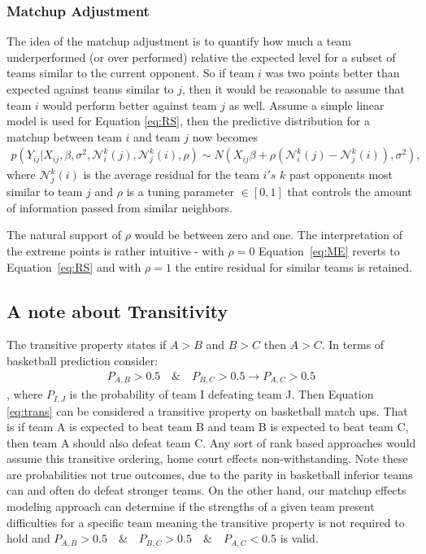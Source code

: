 \subsubsection{Matchup Adjustment}
The idea of the matchup adjustment is to quantify how much a team underperformed (or over performed) relative the expected level for a subset of teams similar to the current opponent.  So if team $i$ was two points better than expected against teams similar to $j$, then it would be reasonable to assume that team $i$ would perform better against team $j$ as well.  Assume a simple linear model is used for Equation \ref{eq:RS}, then the predictive distribution for a matchup between team $i$ and team $j$ now becomes 
\begin{eqnarray}
p(Y_{ij}|X_{ij}, \beta,\sigma^2,\mathcal{N}_i^k(j),\mathcal{N}_j^k(i), \rho) \sim N(X_{ij} \beta + \rho(\mathcal{N}_i^k(j) -\mathcal{N}_j^k(i)), \sigma^2),
\label{eq:ME}
\end{eqnarray}
where $\mathcal{N}_j^k(i)$ is the average residual for the team $i's$ $k$ past opponents most similar to team $j$ and $\rho$ is a tuning parameter $\in [0,1]$ that controls the amount of information passed from similar neighbors. 

The natural support of $\rho$ would be between zero and one.  The interpretation of the extreme points is rather intuitive - with $\rho = 0$ Equation~\ref{eq:ME} reverts to Equation~\ref{eq:RS} and with $\rho = 1$ the entire residual for similar teams is retained. 
\subsection{A note about Transitivity}
The transitive property states if $A>B$ and $B>C$ then $A>C$.   In terms of basketball prediction consider:
\begin{eqnarray}
P_{A,B} > 0.5 \quad \& \quad P_{B,C} > 0.5 \rightarrow P_{A,C} > 0.5
\label{eq:trans}
\end{eqnarray}
, where $P_{I,J}$ is the probability of team I defeating team J.  Then Equation \ref{eq:trans} can be considered a transitive property on basketball match ups.  That is if team A is expected to beat team B and team B is expected to beat team C, then team A should also defeat team C.  Any sort of rank based approaches would assume this transitive ordering, home court effects non-withstanding.  Note these are probabilities not true outcomes, due to the parity in basketball inferior teams can and often do defeat stronger teams.  On the other hand, our matchup effects modeling approach can determine if the strengths of a given team present difficulties for a specific team meaning the transitive property is not required to hold and $P_{A,B} > 0.5 \quad \& \quad P_{B,C} > 0.5\quad \& \quad P_{A,C} < 0.5$ is valid.
